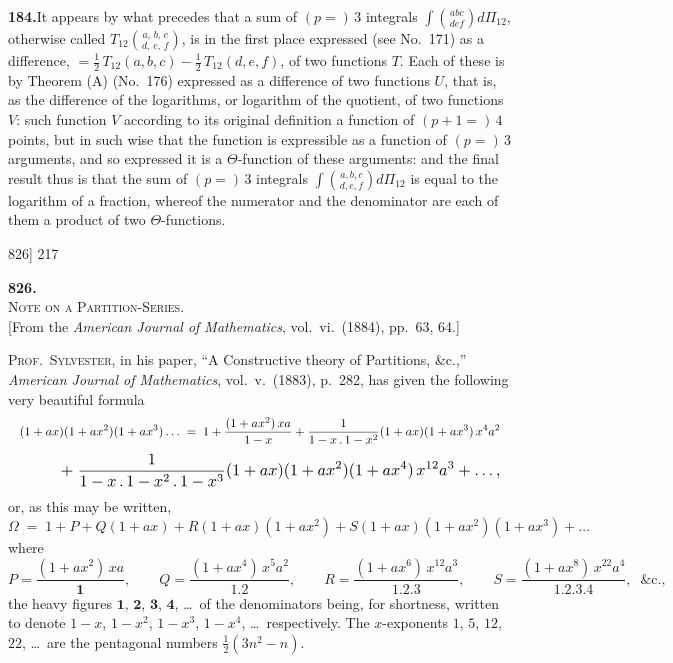 \documentclass[11pt]{article}
\begin{document}
\medskip
\textbf{184.}\quad It appears by what precedes that a sum of $(p=)\,3$ integrals
$\displaystyle\int\!\binom{abc}{def}d\Pi_{12}$,
otherwise called $T_{12}\binom{a,\,b,\,c}{d,\,e,\,f}$, is in the first place expressed (see No.\ 171) as a difference,
$=\tfrac{1}{2}\,T_{12}(a,b,c)-\tfrac{1}{2}\,T_{12}(d,e,f)$, of two functions $T$.  Each of these is by Theorem (A)
(No.\ 176) expressed as a difference of two functions $U$, that is, as the difference of
the logarithms, or logarithm of the quotient, of two functions $V$: such function $V$
according to its original definition a function of $(p+1=)\,4$ points, but in such wise
that the function is expressible as a function of $(p=)\,3$ arguments, and so expressed
it is a $\Theta$-function of these arguments: and the final result thus is that the sum of
$(p=)\,3$ integrals $\displaystyle\int\!\binom{a,b,c}{d,e,f}d\Pi_{12}$ is equal to the logarithm of a fraction, whereof the
numerator and the denominator are each of them a product of two $\Theta$-functions.

\newpage
\noindent\textsc{826] \hfill\hfill 217}
\vspace{1.4em}

\begin{center}
{\Large\bfseries 826.}\\[0.6em]
{\large\scshape Note on a Partition-Series.}\\[0.6em]
{\small [From the \textit{American Journal of Mathematics}, vol.\ vi.\ (1884), pp.\ 63, 64.]}
\end{center}
\vspace{0.6em}

\noindent
\textsc{Prof.\ Sylvester}, in his paper, ``A Constructive theory of Partitions, \&c.,'' \textit{American
Journal of Mathematics}, vol.\ v.\ (1883), p.\ 282, has given the following very beautiful
formula
\[
\resizebox{\textwidth}{!}{$\displaystyle
(1+ax)(1+ax^{2})(1+ax^{3})\ldots \;=\; 1 + \frac{(1+ax^{2})\,xa}{1-x} + \frac{1}{1-x\,.\,1-x^{2}}(1+ax)(1+ax^{3})\,x^{4}a^{2}
$}
\]
\[
\resizebox{\textwidth}{!}{$\displaystyle
\qquad\;\; +\;\frac{1}{1-x\,.\,1-x^{2}\,.\,1-x^{3}}(1+ax)(1+ax^{2})(1+ax^{4})\,x^{12}a^{3}+\ldots,
$}
\]
or, as this may be written,
\[
\Omega \;=\; 1 + P + Q(1+ax) + R(1+ax)(1+ax^{2}) + S(1+ax)(1+ax^{2})(1+ax^{3}) + \ldots
\]
where
\[
P = \frac{(1+ax^{2})\,xa}{\mathbf{1}},\qquad
Q = \frac{(1+ax^{4})\,x^{5}a^{2}}{\mathbf{1.2}},\qquad
R = \frac{(1+ax^{6})\,x^{12}a^{3}}{\mathbf{1.2.3}},\qquad
S = \frac{(1+ax^{8})\,x^{22}a^{4}}{\mathbf{1.2.3.4}},\;\;\&\text{c.,}
\]
the heavy figures $\mathbf{1}$, $\mathbf{2}$, $\mathbf{3}$, $\mathbf{4}$, \ldots\ of the denominators being, for shortness, written to
denote $1-x$, $1-x^{2}$, $1-x^{3}$, $1-x^{4}$, \ldots\ respectively.  The $x$-exponents $1$, $5$, $12$, $22$, \ldots\ are
the pentagonal numbers $\tfrac{1}{2}(3n^{2}-n)$.
\end{document}
